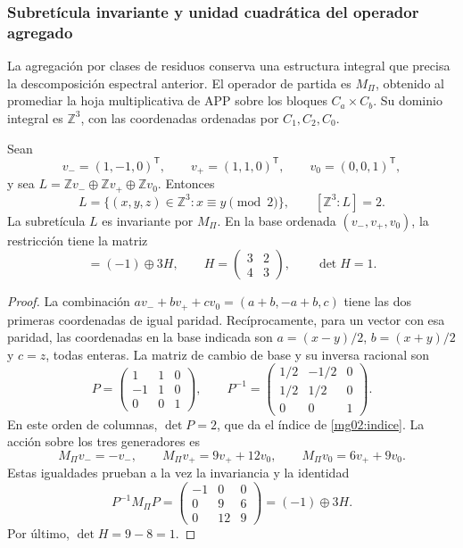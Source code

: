 \subsubsection{Subretícula invariante y unidad cuadrática del operador agregado}
\label{mg02:subreticula}

La agregación por clases de residuos conserva una estructura integral que
precisa la descomposición espectral anterior. El operador de partida es
\(M_\Pi\), obtenido al promediar la hoja multiplicativa de APP sobre
los bloques \(C_a\times C_b\). Su dominio integral es \(\mathbb Z^3\),
con las coordenadas ordenadas por \(C_1,C_2,C_0\).

\begin{proposition}
Sean
\[
 v_-=(1,-1,0)^{\mathsf T},\qquad
 v_+=(1,1,0)^{\mathsf T},\qquad v_0=(0,0,1)^{\mathsf T},
\]
y sea \(L=\mathbb Zv_-\oplus\mathbb Zv_+\oplus\mathbb Zv_0\).
Entonces
\begin{equation}
 L=\{(x,y,z)\in\mathbb Z^3:x\equiv y\pmod2\},
 \qquad [\mathbb Z^3:L]=2.
 \label{mg02:indice}
\end{equation}
La subretícula \(L\) es invariante por \(M_\Pi\). En la base
ordenada \((v_-,v_+,v_0)\), la restricción tiene la matriz
\begin{equation}
 [M_\Pi|_L]=(-1)\oplus3H,\qquad
 H=\begin{pmatrix}3&2\\4&3\end{pmatrix},\qquad \det H=1.
 \label{mg02:restriccion}
\end{equation}
\end{proposition}

\begin{proof}
La combinación \(av_-+bv_++cv_0=(a+b,-a+b,c)\) tiene las dos
primeras coordenadas de igual paridad. Recíprocamente, para un vector
con esa paridad, las coordenadas en la base indicada son
\(a=(x-y)/2\), \(b=(x+y)/2\) y \(c=z\), todas enteras. La matriz
de cambio de base y su inversa racional son
\[
 P=\begin{pmatrix}1&1&0\\-1&1&0\\0&0&1\end{pmatrix},\qquad
 P^{-1}=\begin{pmatrix}1/2&-1/2&0\\1/2&1/2&0\\0&0&1\end{pmatrix}.
\]
En este orden de columnas, \(\det P=2\), que da el índice de
\eqref{mg02:indice}. La acción sobre los tres generadores es
\[
 M_\Pi v_-=-v_-,\qquad
 M_\Pi v_+=9v_++12v_0,\qquad
 M_\Pi v_0=6v_++9v_0.
\]
Estas igualdades prueban a la vez la invariancia y la identidad
\[
 P^{-1}M_\Pi P=
 \begin{pmatrix}-1&0&0\\0&9&6\\0&12&9\end{pmatrix}
 =(-1)\oplus3H.
\]
Por último, \(\det H=9-8=1\).
\end{proof}

